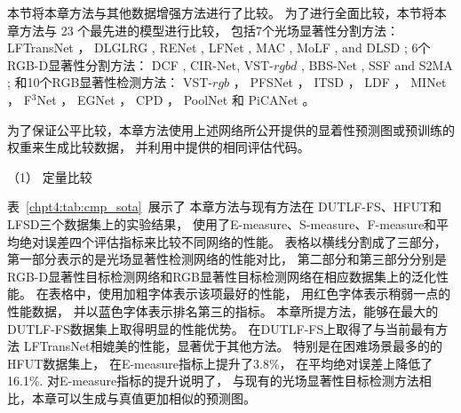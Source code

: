 




本节将本章方法与其他数据增强方法进行了比较。
为了进行全面比较，本节将本章方法与 23 个最先进的模型进行比较，
包括7个光场显著性分割方法：
LFTransNet ，
DLGLRG , RENet , LFNet ,
MAC , MoLF , and DLSD ;
%
%
%
%
6个RGB-D显著性分割方法：
DCF , CIR-Net, VST-$rgbd$  ,
BBS-Net     , SSF and S2MA    ;
%
%
%
%
%
和10个RGB显著性检测方法：
VST-$rgb$ ，
PFSNet ，
ITSD ，
LDF ，
MINet ，
F$^{3}$Net  ， 
EGNet   ，
CPD  ，
PoolNet 和
PiCANet 。


%



为了保证公平比较，本章方法使用上述网络所公开提供的显着性预测图或预训练的权重来生成比较数据，
并利用中提供的相同评估代码。 





（1）
定量比较


表~\ref{chpt4:tab:cmp_sota}~展示了
本章方法与现有方法在
DUTLF-FS、HFUT和LFSD三个数据集上的实验结果，
使用了E-measure、S-measure、F-measure和平均绝对误差四个评估指标来比较不同网络的性能。
表格以横线分割成了三部分，第一部分表示的是光场显著性检测网络的性能对比，
第二部分和第三部分分别是RGB-D显著性目标检测网络和RGB显著性目标检测网络在相应数据集上的泛化性能。
在表格中，使用加粗字体表示该项最好的性能，
用红色字体表示稍弱一点的性能数据，
并以蓝色字体表示排名第三的指标。
本章所提方法，能够在最大的DUTLF-FS数据集上取得明显的性能优势。
在DUTLF-FS上取得了与当前最有方法
LFTransNet相媲美的性能，显著优于其他方法。
特别是在困难场景最多的的HFUT数据集上，
在E-measure指标上提升了3.8\%，
在平均绝对误差上降低了 16.1\%.
对E-measure指标的提升说明了，
与现有的光场显著性目标检测方法相比，本章可以生成与真值更加相似的预测图。


